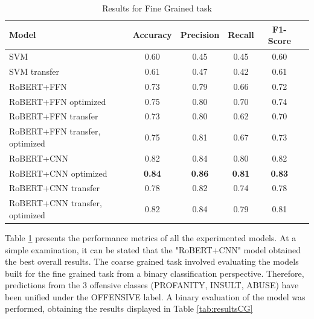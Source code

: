 \documentclass[12pt,a4paper]{report}
\begin{document}
\begin{table}[H]\normalsize\linespread{1}
\centering
\caption{Results for Fine Grained task}
\label{tab:resultsFG}
\begin{tabular}{ l c c c c c} 
  \hline
  \textbf{Model} &  \textbf{Accuracy} & \textbf{Precision} & \textbf{Recall} & \textbf{F1-Score}\\\hline
  SVM & 0.60 & 0.45 & 0.45 & 0.60 \\
  SVM transfer & 0.61 & 0.47 & 0.42 & 0.61 \\\hline
  RoBERT+FFN & 0.73 & 0.79 & 0.66 & 0.72 \\
  RoBERT+FFN optimized & 0.75 & 0.80 & 0.70 & 0.74 \\
  RoBERT+FFN transfer & 0.73 & 0.80 & 0.62 & 0.70 \\
  RoBERT+FFN transfer, optimized & 0.75 & 0.81 & 0.67 & 0.73 \\\hline
  RoBERT+CNN & 0.82 & 0.84 & 0.80 & 0.82 \\
  RoBERT+CNN optimized  & \textbf{0.84} & \textbf{0.86} & \textbf{0.81} & \textbf{0.83} \\
  RoBERT+CNN transfer & 0.78 & 0.82 & 0.74 & 0.78 \\
  RoBERT+CNN transfer, optimized & 0.82 & 0.84 & 0.79 & 0.81 \\\hline
\end{tabular}
\end{table}

Table \ref{tab:resultsFG} presents the performance metrics of all the experimented models. At a simple examination, it can be stated that the "RoBERT+CNN" model obtained the best overall results. 
\newline
\newline
The coarse grained task involved evaluating the models built for the fine grained task from a binary classification perspective. Therefore, predictions from the 3 offensive classes (PROFANITY, INSULT, ABUSE) have been unified under the OFFENSIVE label. A binary evaluation of the model was performed, obtaining the results displayed in Table \ref{tab:resultsCG}
\end{document}
